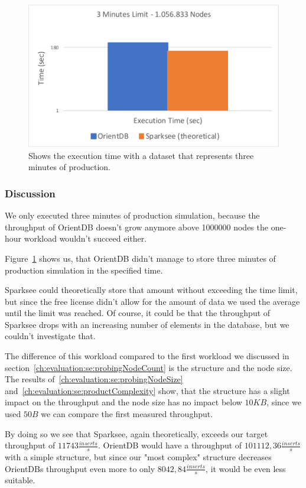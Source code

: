 \begin{figure}[h!]
  \centering
  \includegraphics[width=.75\textwidth]{images/production/singleSuitability}
  \caption{Shows the execution time with a dataset that represents three minutes of production.}
  \label{fig:singleSuitability}
\end{figure}

\subsubsection{Discussion}
\label{ch:evaluation:se:suitabilityDiscussion}
We only executed three minutes of production simulation,
because the throughput of OrientDB doesn't grow anymore above 1000000 nodes the one-hour workload wouldn't succeed either.

Figure~\ref{fig:singleSuitability} shows us,
that OrientDB didn't manage to store three minutes of production simulation in the specified time.

Sparksee could theoretically store that amount without exceeding the time limit,
but since the free license didn't allow for the amount of data we used the average until the limit was reached.
Of course,
it could be that the throughput of Sparksee drops with an increasing number of elements in the database,
but we couldn't investigate that.

The difference of this workload compared to the first workload we discussed in section~\ref{ch:evaluation:se:probingNodeCount} is the structure and the node size.
The results of~\ref{ch:evaluation:se:probingNodeSize} and~\ref{ch:evaluation:se:productComplexity} show,
that the structure has a slight impact on the throughput and the node size has no impact below $ 10KB $,
since we used $ 50B $ we can compare the first measured throughput.

By doing so we see that Sparksee,
again theoretically,
exceeds our target throughput of $ 11743 \frac{inserts}{s} $.
OrientDB would have a throughput of $ 101112,36 \frac{inserts}{s} $ with a simple structure,
but since our "most complex" structure decreases OrientDBs throughput even more to only $ 8042,84 \frac{inserts}{s} $,
it would be even less suitable.

